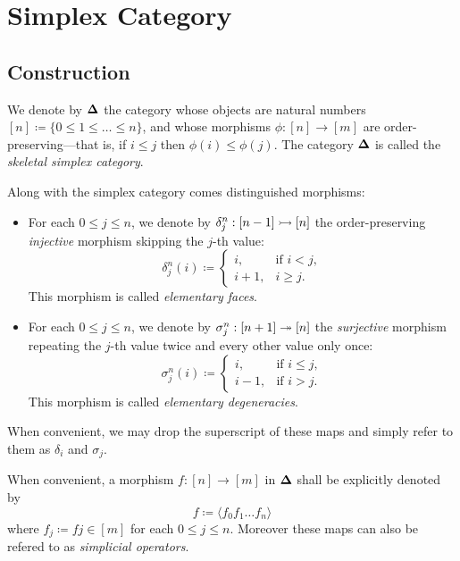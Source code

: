 \section{Simplex Category}

\subsection{Construction}

\begin{definition}
\label{def:skeletal-simplex-category}
We denote by \({\mathbf{\Delta}}\) the category whose objects are natural numbers
\([n] \coloneq \{0 \leq 1 \leq \dots \leq n\}\), and whose morphisms
\(\phi: [n] \to [m]\) are order-preserving---that is, if \(i \leq j\) then
\(\phi(i) \leq \phi(j)\). The category \({\mathbf{\Delta}}\) is called the \emph{skeletal
  simplex category}.

Along with the simplex category comes distinguished morphisms:
\begin{itemize}\setlength\itemsep{0em}
\item For each \(0 \leq j \leq n\), we denote by
  \(\delta_j^n: [n - 1] \rightarrowtail [n]\) the order-preserving \emph{injective}
  morphism skipping the \(j\)-th value:
  \[
  \delta_j^n(i) \coloneq
  \begin{cases}
    i, &\text{if } i < j, \\
    i + 1, &i \geq j.
  \end{cases}
  \]
  This morphism is called \emph{elementary faces}.

\item For each \(0 \leq j \leq n\), we denote by
  \(\sigma_j^n: [n + 1] \twoheadrightarrow [n]\) the \emph{surjective} morphism repeating the
  \(j\)-th value twice and every other value only once:
  \[
  \sigma_j^n(i) \coloneq
  \begin{cases}
    i, &\text{if } i \leq j, \\
    i - 1, &\text{if } i > j.
  \end{cases}
  \]
  This morphism is called \emph{elementary degeneracies}.
\end{itemize}
When convenient, we may drop the superscript of these maps and simply refer to
them as \(\delta_i\) and \(\sigma_j\).
\end{definition}

\begin{notation}
\label{not:simplex-morphisms}
When convenient, a morphism \(f: [n] \to [m]\) in \({\mathbf{\Delta}}\) shall be explicitly
denoted by
\[
f \coloneq \langle f_0 f_1 \dots f_n \rangle
\]
where \(f_j \coloneq f j \in [m]\) for each \(0 \leq j \leq n\). Moreover these
maps can also be refered to as \emph{simplicial operators}.
\end{notation}

